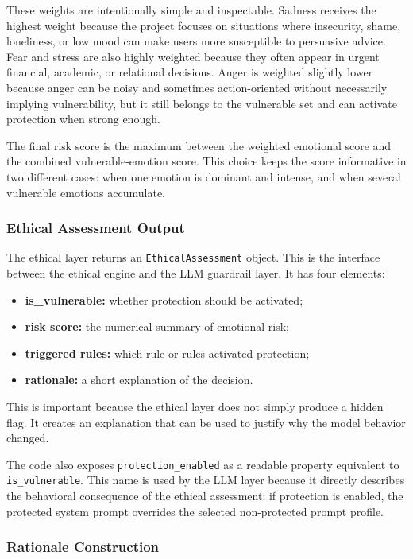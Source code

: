 \documentclass[11pt,a4paper]{article}
\newcommand{\code}[1]{\texttt{#1}}
\begin{document}
These weights are intentionally simple and inspectable. Sadness receives the highest weight
because the project focuses on situations where insecurity, shame, loneliness, or low mood
can make users more susceptible to persuasive advice. Fear and stress are also highly
weighted because they often appear in urgent financial, academic, or relational decisions.
Anger is weighted slightly lower because anger can be noisy and sometimes action-oriented
without necessarily implying vulnerability, but it still belongs to the vulnerable set and
can activate protection when strong enough.

The final risk score is the maximum between the weighted emotional score and the combined
vulnerable-emotion score. This choice keeps the score informative in two different cases:
when one emotion is dominant and intense, and when several vulnerable emotions accumulate.

\subsubsection{Ethical Assessment Output}

The ethical layer returns an \code{EthicalAssessment} object. This is the interface between
the ethical engine and the LLM guardrail layer. It has four elements:

\begin{itemize}[leftmargin=1.8em]
\item \textbf{is\_vulnerable:} whether protection should be activated;
\item \textbf{risk score:} the numerical summary of emotional risk;
\item \textbf{triggered rules:} which rule or rules activated protection;
\item \textbf{rationale:} a short explanation of the decision.
\end{itemize}

This is important because the ethical layer does not simply produce a hidden flag. It creates
an explanation that can be used to justify why the model behavior changed.

The code also exposes \code{protection\_enabled} as a readable property equivalent to
\code{is\_vulnerable}. This name is used by the LLM layer because it directly describes the
behavioral consequence of the ethical assessment: if protection is enabled, the protected
system prompt overrides the selected non-protected prompt profile.

\subsubsection{Rationale Construction}
\end{document}

